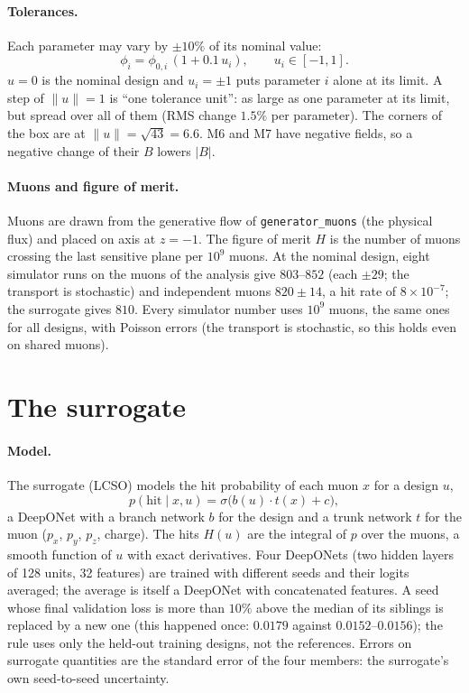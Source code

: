 \documentclass[11pt,a4paper]{article}
\begin{document}
\paragraph{Tolerances.}
Each parameter may vary by $\pm10\%$ of its nominal value:
\begin{equation}
  \phi_i = \phi_{0,i}\,(1 + 0.1\,u_i), \qquad u_i\in[-1,1].
\end{equation}
$u=0$ is the nominal design and $u_i=\pm1$ puts parameter $i$ alone at its limit. A step of
$\|u\|=1$ is ``one tolerance unit'': as large as one parameter at its limit, but spread over all
of them (RMS change $1.5\%$ per parameter). The corners of the box are at $\|u\|=\sqrt{43}=6.6$.
M6 and M7 have negative fields, so a negative change of their $B$ lowers $|B|$.

\paragraph{Muons and figure of merit.}
Muons are drawn from the generative flow of \texttt{generator\_muons} (the physical flux) and
placed on axis at $z=-1$. The figure of merit $H$ is the number of muons crossing the last
sensitive plane per $10^9$ muons. At the nominal design, eight simulator runs on the muons of
the analysis give $803$--$852$ (each $\pm29$; the transport is stochastic) and independent muons
$820\pm14$, a hit rate of $8\times10^{-7}$; the surrogate gives $810$. Every simulator number uses $10^9$ muons, the same ones for all designs, with
Poisson errors (the transport is stochastic, so this holds even on shared muons).

\section{The surrogate}

\paragraph{Model.}
The surrogate (LCSO) models the hit probability of each muon $x$ for a design $u$,
\begin{equation}
  p(\text{hit}\mid x,u) = \sigma\!\big(b(u)\cdot t(x) + c\big),
\end{equation}
a DeepONet with a branch network $b$ for the design and a trunk network $t$ for the muon
($p_x$, $p_y$, $p_z$, charge). The hits $H(u)$ are the integral of $p$ over the muons, a smooth
function of $u$ with exact derivatives. Four DeepONets (two hidden layers of 128 units, 32
features) are trained with different seeds and their logits averaged; the average is itself a
DeepONet with concatenated features. A seed whose final validation loss is more than $10\%$
above the median of its siblings is replaced by a new one (this happened once: $0.0179$ against
$0.0152$--$0.0156$); the rule uses only the held-out training designs, not the references. Errors on surrogate quantities are the standard error of
the four members: the surrogate's own seed-to-seed uncertainty.
\end{document}
